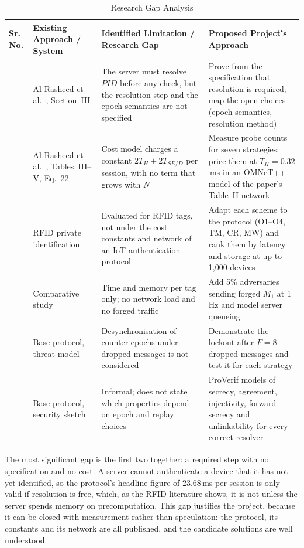 \begin{table}[H]
\centering
\caption{Research Gap Analysis}
\label{tab:gaps}
\small
\renewcommand{\arraystretch}{1.2}
\begin{tabularx}{\textwidth}{|>{\centering\arraybackslash}p{}|>{\raggedright\arraybackslash}p{}|>{\raggedright\arraybackslash}X|>{\raggedright\arraybackslash}X|}
\hline
\textbf{Sr. No.} & \textbf{Existing Approach / System} & \textbf{Identified Limitation / Research Gap} & \textbf{Proposed Project's Approach}\\ \hline
1 & Al-Rasheed et al.~\cite{base}, Section~III & The server must resolve $PID$ before any check, but the resolution step and the epoch semantics are not specified & Prove from the specification that resolution is required; map the open choices (epoch semantics, resolution method)\\ \hline
2 & Al-Rasheed et al.~\cite{base}, Tables~III--V, Eq.~22 & Cost model charges a constant $2T_H+2T_{SE/D}$ per session, with no term that grows with $N$ & Measure probe counts for seven strategies; price them at $T_H=0.32$\,ms in an OMNeT++ model of the paper's Table~II network\\ \hline
3 & RFID private identification~\cite{weis,ohkubo,molnar,avoine05,tsudik} & Evaluated for RFID tags, not under the cost constants and network of an IoT authentication protocol & Adapt each scheme to the protocol (O1--O4, TM, CR, MW) and rank them by latency and storage at up to 1,000 devices\\ \hline
4 & Comparative study~\cite{ado05} & Time and memory per tag only; no network load and no forged traffic & Add 5\% adversaries sending forged $M_1$ at 1\,Hz and model server queueing\\ \hline
5 & Base protocol, threat model & Desynchronisation of counter epochs under dropped messages is not considered & Demonstrate the lockout after $F=8$ dropped messages and test it for each strategy\\ \hline
6 & Base protocol, security sketch & Informal; does not state which properties depend on epoch and replay choices & ProVerif models of secrecy, agreement, injectivity, forward secrecy and unlinkability for every correct resolver\\ \hline
\end{tabularx}
\end{table}

The most significant gap is the first two together: a required step with no specification and no cost. A server cannot authenticate a device that it has not yet identified, so the protocol's headline figure of 23.68\,ms per session is only valid if resolution is free, which, as the RFID literature shows, it is not unless the server spends memory on precomputation. This gap justifies the project, because it can be closed with measurement rather than speculation: the protocol, its constants and its network are all published, and the candidate solutions are well understood.

